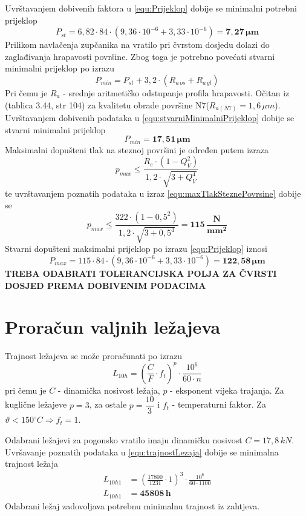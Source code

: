 \documentclass[11pt,a4paper]{report}
\begin{document}
Uvrštavanjem dobivenih faktora u \eqref{equ:Prijeklop} dobije se minimalni potrebni prijeklop
$$
P_{st}=6,82 \cdot 84 \cdot (9,36 \cdot 10^{-6} + 3,33 \cdot 10^{-6})= \mathbf{7,27 \, \mu m}
$$
Prilikom navlačenja zupčanika na vratilo pri čvrstom dosjedu dolazi do zaglađivanja hrapavosti površine. Zbog toga je potrebno povećati stvarni minimalni prijeklop po izrazu
\begin{equation}
P_{min}=P_{st}+3,2 \cdot (R_{a \, os}+R_{a \, gl})\label{equ:stvarniMinimalniPrijeklop}
\end{equation}
Pri čemu je $R_a$ - srednje aritmetičko odstupanje profila hrapavosti. Očitan iz \cite{krivzan1998osnove}(tablica 3.44, str 104) za kvalitetu obrade površine N7($R_{a(N7)}=1,6 \, \mu m$).
Uvrštavanjem dobivenih podataka u \eqref{equ:stvarniMinimalniPrijeklop} dobije se stvarni minimalni prijeklop
$$
P_{min}=\mathbf{17,51 \, \mu m}
$$
Maksimalni dopušteni tlak na steznoj površini je određen putem izraza
\begin{equation}
p_{max}\leq\frac{R_e \cdot (1-Q_V^2)}{1,2\cdot \sqrt{3+Q_V^4}}\label{equ:maxTlakSteznePovrsine}
\end{equation}
te uvrštavanjem poznatih podataka u izraz \eqref{equ:maxTlakSteznePovrsine} dobije se
$$
p_{max}\leq\frac{322 \cdot (1-0,5^2)}{1,2\cdot \sqrt{3+0,5^4}}=\mathbf{115 \, \dfrac{N}{mm^2}}
$$
Stvarni dopušteni maksimalni prijeklop po izrazu \eqref{equ:Prijeklop} iznosi
$$
P_{max}=115 \cdot 84 \cdot (9,36 \cdot 10^{-6} + 3,33 \cdot 10^{-6})= \mathbf{122,58 \, \mu m}
$$
\textbf{TREBA ODABRATI TOLERANCIJSKA POLJA ZA ČVRSTI DOSJED PREMA DOBIVENIM PODACIMA}

\section{Proračun valjnih ležajeva}
Trajnost ležajeva se može proračunati po izrazu
\begin{equation}
L_{10h}=\left(\frac{C}{F} \cdot f_t \right)^p \cdot \frac{10^6}{60 \cdot n}
\label{equ:trajnostLezaja}
\end{equation}
pri čemu je $C$ - dinamička nosivost ležaja, $p$ - eksponent vijeka trajanja. Za kuglične ležajeve $p=3$, za ostale $p=\dfrac{10}{3}$ i $f_t$ - temperaturni faktor. Za $\vartheta < 150^\circ C \Rightarrow f_t=1$.

Odabrani ležajevi za pogonsko vratilo imaju dinamičku nosivost $C=17,8 \,kN$.
Uvršavanje poznatih podataka u \eqref{equ:trajnostLezaja} dobije se minimalna trajnost ležaja
\begin{align*}
L_{10h1}&=\left(\frac{17800}{1231} \cdot 1 \right)^3 \cdot \frac{10^6}{60 \cdot 1100}\\
L_{10h1}&=\mathbf{45808\, h}
\end{align*}
Odabrani ležaj zadovoljava potrebnu minimalnu trajnost iz zahtjeva.
\end{document}
